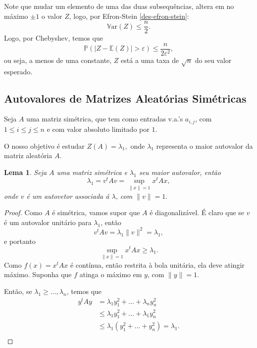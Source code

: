 \documentclass[12pt,a4paper,oneside]{book}
\newtheorem{lemma}[theorem]{Lema}
\theoremstyle{definition}
\theoremstyle{remark}
\numberwithin{equation}{section}
\newcommand{\e}{\varepsilon}
\newcommand{\E}{\mathbb{E}}
\newcommand{\pr}{\mathbb{P}}
\newcommand{\Var}{\mathbb{V}\text{ar}}
\begin{document}
Note que mudar um elemento de uma das duas subsequências, altera em no máximo $\pm 1$ o valor $Z$, logo, por Efron-Stein \ref{des-efron-stein}:
$$\Var(Z)\leq \dfrac{n}{2}. $$
Logo, por Chebyshev, temos que
$$\pr(|Z-\E(Z)|>\e)\leq \dfrac{n}{2\e^2}, $$
ou seja, a menos de uma constante, $Z$ está a uma taxa de $\sqrt{n}$ do seu valor esperado.




\subsection{Autovalores de Matrizes Aleatórias Simétricas}
Seja $A$ uma matriz simétrica, que tem como entradas v.a.'s $a_{i,j}$, com   $1\leq i\leq j \leq n$ e com valor absoluto limitado por $1$. 

O nosso objetivo é estudar $Z(A)=\lambda_1,$ onde  $\lambda_1$ representa o maior autovalor da matriz aleatória $A$.

\begin{lemma}
Seja $A$ uma matriz simétrica e $\lambda_1$ seu maior autovalor, então
$$\lambda_1 =v^t A v= \sup_{\|x\|=1} x^t A x,$$
onde $v$ é um autovetor associada á $\lambda$, com $\|v\|=1.$
\end{lemma}
\begin{proof}
Como $A$ é simétrica, vamos supor que $A$ é diagonalizável. É claro que se $v$ é um autovalor unitário para $\lambda_1$, então
$$v^t A v = \lambda_1 \|v\|^2 = \lambda_1, $$
e portanto
$$\sup_{\|x\|=1} x^t A x \geq \lambda_1. $$ 
Como $f(x) = x^t A x$ é contínua, então restrita à bola unitária,  ela deve atingir máximo. Suponha que $f$ atinga o máximo em $y$, com $\|y\|=1$. 

Então, se $\lambda_1\geq \dots,\lambda_n$, temos que
\begin{align*}
y^tAy &= \lambda_1y_1^2 + \dots+\lambda_ny_n^2\\
&\leq   \lambda_1y_1^2 + \dots+\lambda_1y_n^2\\
&\leq   \lambda_1(y_1^2 + \dots+y_n^2) = \lambda_1.\\
\end{align*} 
\end{proof}
\end{document}
